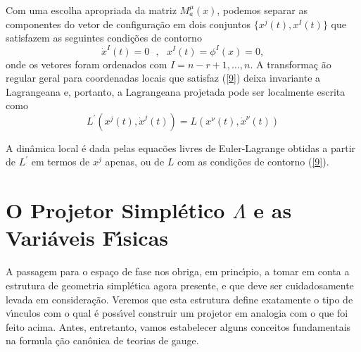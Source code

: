 \documentclass[a4paper,thmsa,12pt]{report}
\begin{document}
Com uma escolha apropriada da matriz $M_{a}^{\mu }(x)$, podemos separar as
componentes do vetor de configura\c{c}\~{a}o em dois conjuntos $%
\{x^{j}(t),x^{I}(t)\}$ que satisfazem as seguintes condi\c{c}\~{o}es de
contorno \cite{cma} 
\begin{equation}
\dot{x}^{I}(t)=0~~~,~~~x^{I}(t)=\phi ^{I}(x)=0,  \label{9}
\end{equation}
onde os vetores foram ordenados com $I=n-r+1,\ldots ,n$. A transforma\c{c}%
\~{a}o regular geral para coordenadas locais que satisfaz (\ref{9}) deixa
invariante a Lagrangeana e, portanto, a Lagrangeana projetada pode ser
localmente escrita como 
\begin{equation}
L^{\prime }(x^{j}(t),{\dot{x}}^{j}(t))=L(x^{\nu }(t),{\dot{x}}^{\nu }(t))
\label{10}
\end{equation}

A din\^{a}mica local \'{e} dada pelas equac\~{o}es livres de Euler-Lagrange
obtidas a partir de $L^{\prime }$ em termos de $x^{j}$ apenas, ou de $L$ com
as condi\c{c}\~{o}es de contorno (\ref{9}).

\section{{\sc O Projetor Simpl\'etico $\Lambda $ e as Vari\'aveis
F\'{\i}sicas}}

A passagem para o espa\c{c}o de fase nos obriga, em princ\'{\i}pio, a tomar
em conta a estrutura de geometria simpl\'{e}tica agora presente, e que deve
ser cuidadosamente levada em consi\-de\-ra\c{c}\~{a}o. Veremos que esta
estrutura define exatamente o tipo de v\'{\i}nculos com o qual \'{e}
poss\'{\i}vel construir um projetor em analogia com o que foi feito acima.
Antes, entretanto, vamos estabelecer alguns conceitos fundamentais na formula%
\c{c}\~{a}o can\^{o}nica de teorias de gauge.
\end{document}
